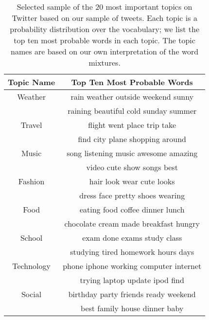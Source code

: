 \documentclass{sig-alternate-05-2015}
\begin{document}
\begin{table}
\centering
\caption{\label{table} Selected sample of the 20 most important topics on Twitter based on our sample of tweets. Each topic is a probability distribution over the vocabulary; we list the top ten most probable words in each topic. The topic names are based on our own interpretation of the word mixtures.}
\begin{tabular}{|c|c|} \hline
Topic Name & Top Ten Most Probable Words \\ \hline
Weather & rain weather outside weekend sunny \\
\quad & raining beautiful cold sunday summer \\ \hline
Travel & flight went place trip take \\
\quad & find city plane shopping around \\ \hline
Music & song listening music awesome amazing \\
\quad & video cute show songs best \\ \hline
Fashion & hair look wear cute looks \\
\quad & dress face pretty shoes wearing \\ \hline
Food & eating food coffee dinner lunch \\
\quad & chocolate cream made breakfast hungry \\ \hline
School & exam done exams study class \\
\quad & studying tired homework hours days \\ \hline
Technology & phone iphone working computer internet \\
\quad & trying laptop update ipod find \\ \hline
Social & birthday party friends ready weekend \\
\quad & best family house dinner baby \\ \hline

\end{tabular}
\end{table}
\end{document}
